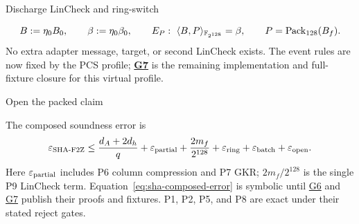 \begin{pvstep}[3.0in]{Discharge LinCheck and ring-switch}{%
}
\begin{pvexchange}
\end{pvexchange}
\begin{equation}
 B:=\eta_0B_0,\qquad \beta:=\eta_0\beta_0,
 \qquad E_P:\ \langle B,P\rangle_{\mathbb F_{2^{128}}}=\beta,\qquad P=\operatorname{Pack}_{128}(B_f).
 \label{eq:sha-ring-successor}
\end{equation}
No extra adapter message, target, or second LinCheck exists.  The event rules
are now fixed by the PCS profile; \textbf{\hyperlink{gap:sha-g7}{G7}} is the
remaining implementation and full-fixture closure for this virtual profile.
\end{pvstep}

\begin{pvstep}[2.4in]{Open the packed claim}{%
}
\begin{pvexchange}
\end{pvexchange}
The composed soundness error is
\begin{equation}
 \varepsilon_{\rm SHA\text{-}F2Z}
 \le \frac{d_A+2d_h}{q}
   +\varepsilon_{\rm partial}
   +\frac{2m_f}{2^{128}}
   +\varepsilon_{\rm ring}
   +\varepsilon_{\rm batch}
   +\varepsilon_{\rm open}.
 \label{eq:sha-composed-error}
\end{equation}
Here $\varepsilon_{\rm partial}$ includes P6 column compression and P7 GKR;
$2m_f/2^{128}$ is the single P9 LinCheck term.
Equation~\eqref{eq:sha-composed-error} is symbolic until
\hyperlink{gap:sha-g6}{G6} and \hyperlink{gap:sha-g7}{G7} publish their proofs
and fixtures.  P1, P2, P5, and P8 are exact under their stated reject gates.
\end{pvstep}

